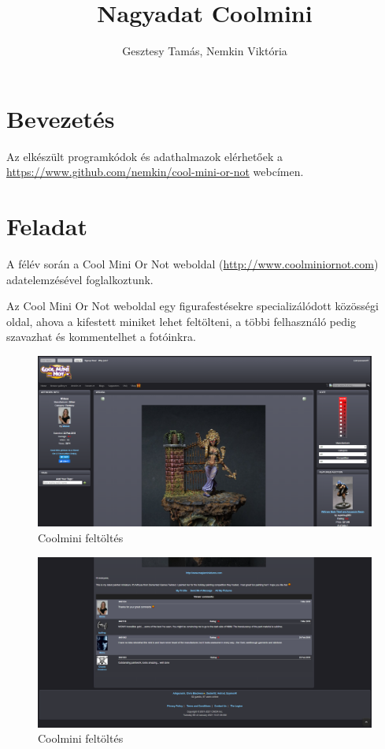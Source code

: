 \documentclass[14pt,a4paper]{article}
\title{Nagyadat Coolmini}
\author{Gesztesy Tamás, Nemkin Viktória}
\date{}
\begin{document}
\maketitle

\section{Bevezetés}

Az elkészült programkódok és adathalmazok elérhetőek a\\
\href{https://www.github.com/nemkin/cool-mini-or-not}{\url{https://www.github.com/nemkin/cool-mini-or-not}} webcímen.

\section{Feladat}

A félév során a Cool Mini Or Not weboldal (\href{http://www.coolminiornot.com}{\url{http://www.coolminiornot.com}})
adatelemzésével foglalkoztunk.

Az Cool Mini Or Not weboldal egy figurafestésekre specializálódott közösségi oldal, ahova a kifestett miniket
lehet feltölteni, a többi felhasználó pedig szavazhat és kommentelhet a fotóinkra.

\begin{figure}[H]
\centering
\includegraphics[width=1.0\columnwidth]{pics/page_submission.png}
\caption{Coolmini feltöltés}
\end{figure}

\begin{figure}[H]
\centering
\includegraphics[width=1.0\columnwidth]{pics/page_comments.png}
\caption{Coolmini feltöltés}
\end{figure}
\end{document}
